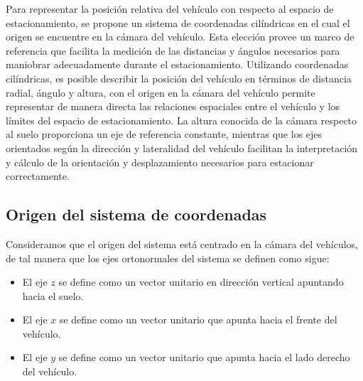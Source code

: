 \noindent  Para  representar la  posición  relativa  del vehículo  con
respecto  al espacio  de  estacionamiento, se  propone  un sistema  de
coordenadas cilíndricas en el cual el origen se encuentre en la cámara
del vehículo. Esta elección provee un marco de referencia que facilita
la  medición de  las distancias  y ángulos  necesarios para  maniobrar
adecuadamente  durante   el  estacionamiento.
\noindent Utilizando coordenadas cilíndricas,  es posible describir la
posición  del  vehículo en  términos  de  distancia radial,  ángulo  y
altura, con el origen en la cámara del vehículo permite representar de
manera  directa las  relaciones  espaciales entre  el  vehículo y  los
límites  del espacio  de  estacionamiento. La  altura  conocida de  la
cámara respecto al  suelo proporciona un eje  de referencia constante,
mientras que los ejes orientados  según la dirección y lateralidad del
vehículo facilitan  la interpretación  y cálculo  de la  orientación y
desplazamiento necesarios para estacionar correctamente.

\subsection{Origen del sistema de coordenadas}
Consideramos que el origen del sistema está centrado en la cámara del vehículos, de tal manera que los ejes ortonormales del sistema se definen como sigue:
\begin{itemize}
    \item El eje $z$ se define como un vector unitario en dirección vertical  apuntando hacia el suelo.
    \item El eje $x$ se define como un vector unitario que apunta hacia el frente del vehículo.
    \item El eje $y$ se define como un vector unitario que apunta hacia el lado derecho del vehículo.
\end{itemize}


